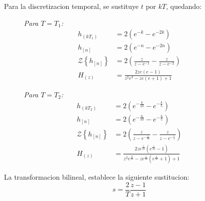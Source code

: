 \documentclass[a4paper,12pt]{report}
\begin{document}
\begin{enumerate}[label=\alph*), left=0pt]
                Para la discretizacion temporal, se sustituye $t$ por $kT$, quedando:
                \begin{figure}[!h]
                    \centering
                    \begin{minipage}{0.4\textwidth}
                        \centering
                        \textit{Para $T = T_1$:}
                        \begin{align*}
                            h_{(kT_1)} &= 2\left(e^{-k} - e^{-2 k}\right)\\
                            h_{[n]} &= 2\left(e^{-n} - e^{-2 n}\right)\\
                            \mathcal{Z}\left\{h_{[n]}\right\} &= 2\left(\frac{z}{z - e^{-1}} - \frac{z}{z - e^{-2}} \right)\\
                            H_{(z)} &= \frac{2 z e (e - 1)}{z^2 e^3 - z e (e + 1) + 1}
                        \end{align*}
                    \end{minipage}
                    \hspace{0.5cm}
                    \centering
                    \begin{minipage}{0.4\textwidth}
                        \centering
                        \textit{Para $T = T_2$:}
                        \begin{align*}
                            h_{(kT_2)} &= 2\left(e^{-\frac{k}{10}} - e^{-\frac{k}{5}}\right)\\
                            h_{[n]} &= 2\left(e^{-\frac{n}{10}} - e^{-\frac{n}{5}}\right)\\
                            \mathcal{Z}\left\{h_{[n]}\right\} &= 2\left(\frac{z}{z - e^{-\frac{1}{10}}} - \frac{z}{z - e^{-\frac{1}{5}}} \right)\\
                            H_{(z)} &= \frac{2 z e^{\frac{1}{10}} (e^{\frac{1}{10}} - 1)}{z^2 e^{\frac{3}{10}} - z  e^{\frac{1}{10}}(e^{\frac{1}{10}} + 1) + 1}
                        \end{align*}
                    \end{minipage}
                \end{figure}

                La transformacion bilineal, establece la siguiente sustitucion:
                \begin{equation}
                    \label{bilineal}
                    s = \frac{2}{T} \frac{z - 1}{z + 1}
                \end{equation}


\end{enumerate}
\end{document}
